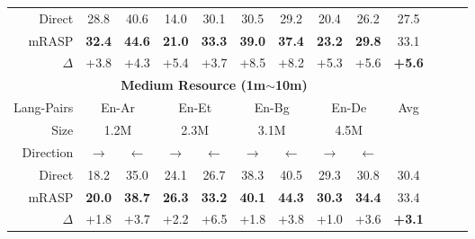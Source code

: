\documentclass[11pt,a4paper]{article}
\newcommand{\mf}[1]{\multicolumn{2}{c}{ #1}}
\newcommand{\smf}[1]{\multicolumn{2}{c}{#1}}
\newcommand{\method}{mRASP\xspace}
\newcommand{\baseline}{Direct}
\begin{document}
\begin{table*}[htb]
\begin{center}
\begin{tabular}{rcccccccccccc}
\midrule
 \baseline &
28.8 & 40.6 & 14.0 & 30.1 & 30.5 & 29.2 & 20.4 & 26.2 & 27.5
\\


 \method &
\bf 32.4 & \bf 44.6 &  \bf 21.0 & \bf 33.3 & \bf 39.0 & \bf 37.4 & \bf 23.2 & \bf 29.8 & 33.1

\\

$\Delta$ &
+3.8 & +4.3 &
+5.4 & +3.7  &
+8.5 & +8.2 &
+5.3 & +5.6 &
\textbf{+5.6}

\\

\midrule
\midrule
&\multicolumn{7}{c}{\textbf{Medium Resource (1m$\sim$10m)}} \\
\midrule


Lang-Pairs & 
\mf{En-Ar} &
\mf{En-Et} &
\mf{En-Bg} &
\mf{En-De} &
Avg
\\



Size &
\smf{1.2M}  & \smf{2.3M} & \smf{3.1M} & \smf{4.5M}  

\\


Direction & 
 $\rightarrow$ &$\leftarrow$ &

 $\rightarrow$ &$\leftarrow$ &

 $\rightarrow$ &$\leftarrow$ &

 $\rightarrow$ &$\leftarrow$ \\



\midrule
 \baseline &
18.2 & 35.0 & 24.1 & 26.7 & 38.3 & 40.5 & 29.3 & 30.8 &  30.4
\\


 \method &
\bf 20.0 & \bf 38.7 & \bf 26.3 & \bf 33.2 & \bf 40.1 & \bf 44.3 & \bf 30.3 & \bf 34.4 & 33.4
\\

$\Delta$ &
+1.8 & +3.7 &
+2.2 & +6.5 &
+1.8 & +3.8 &
+1.0 & +3.6 &
\textbf{+3.1}

\\

\bottomrule
\end{tabular}
\caption{Fine-tuning performance on \emph{extremely low} / \emph{low} / \emph{medium} resource machine translation settings. The numbers in parentheses indicate the size of parallel corpus for fine-tuning.   
Pre-training with \method and then fine-tuning on downstream MT tasks consistently improves over MT models directly trained on bilingual parallel corpus. }
\label{tab:LowR}
\end{center}
\end{table*} 
\end{document}
